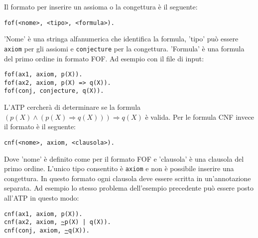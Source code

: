 \documentclass[./main.tex]{subfiles}
\begin{document}
Il formato per inserire un assioma o la congettura è il seguente:

\begin{center}
  \texttt{fof(<nome>, <tipo>, <formula>).}
\end{center}
'Nome' è una stringa alfanumerica che identifica la formula, 'tipo' può essere \texttt{axiom} per gli assiomi e \texttt{conjecture} per la congettura.
'Formula' è una formula del primo ordine in formato FOF. Ad esempio con il file di input:

\begin{center}
  \texttt{fof(ax1, axiom, p(X)).} \\
  \texttt{fof(ax2, axiom, p(X) => q(X)).} \\
  \texttt{fof(conj, conjecture, q(X)).} \\
\end{center}

L'ATP cercherà di determinare se la formula $(p(X) \land (p(X) \Rightarrow q(X))) \Rightarrow q(X)$ è valida.
Per le formula CNF invece il formato è il seguente:

\begin{center}
  \texttt{cnf(<nome>, axiom, <clausola>).}
\end{center}

Dove 'nome' è definito come per il formato FOF e 'clausola' è una clausola del primo ordine.
L'unico tipo consentito è \texttt{axiom} e non è possibile inserire una congettura.
In questo formato ogni clausola deve essere scritta in un'annotazione separata.
Ad esempio lo stesso problema dell'esempio precedente può essere posto all'ATP in questo modo:

\begin{center}
  \texttt{cnf(ax1, axiom, p(X)).} \\
  \texttt{cnf(ax2, axiom, \url{~}p(X) | q(X)).} \\
  \texttt{cnf(conj, axiom, \url{~}q(X)).} \\
\end{center}
\end{document}
